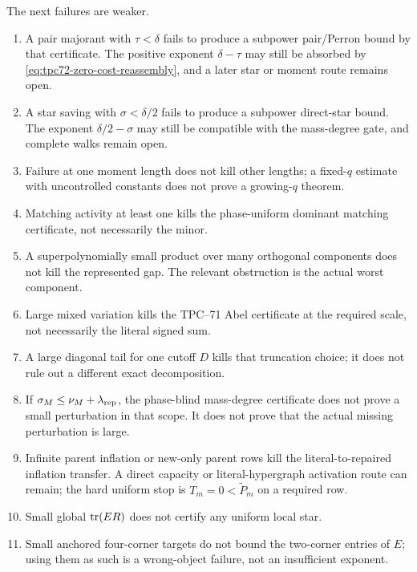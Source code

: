The next failures are weaker.
\begin{enumerate}[label=\textup{(C\arabic*)},leftmargin=3.6em]
 \item A pair majorant with \(\tau<\delta\) fails to produce a subpower
       pair/Perron bound by that certificate.  The positive exponent
       \(\delta-\tau\) may still be absorbed by
       \eqref{eq:tpc72-zero-cost-reassembly}, and a later star or moment
       route remains open.
 \item A star saving with \(\sigma<\delta/2\) fails to produce a subpower
       direct-star bound.  The exponent \(\delta/2-\sigma\) may still be
       compatible with the mass-degree gate, and complete walks remain
       open.
 \item Failure at one moment length does not kill other lengths; a
       fixed-\(q\) estimate with uncontrolled constants does not prove a
       growing-\(q\) theorem.
 \item Matching activity at least one kills the phase-uniform dominant
       matching certificate, not necessarily the minor.
 \item A superpolynomially small product over many orthogonal components
       does not kill the represented gap.  The relevant obstruction is the
       actual worst component.
 \item Large mixed variation kills the TPC--71 Abel certificate at the
       required scale, not necessarily the literal signed sum.
 \item A large diagonal tail for one cutoff \(D\) kills that truncation
       choice; it does not rule out a different exact decomposition.
 \item If
       \(\sigma_M\le\nu_M+\lambda_{\rm rep}\), the phase-blind mass-degree
       certificate does not prove a small perturbation in that scope.  It
       does not prove that the actual missing perturbation is large.
 \item Infinite parent inflation or new-only parent rows kill the
       literal-to-repaired inflation transfer.  A direct capacity or
       literal-hypergraph activation route can remain; the hard uniform
       stop is \(T_m=0<\widetilde P_m\) on a required row.
 \item Small global \(\operatorname{tr}(ER)\) does not certify any uniform local star.
 \item Small anchored four-corner targets do not bound the two-corner
       entries of \(E\); using them as such is a wrong-object failure, not
       an insufficient exponent.
\end{enumerate}

